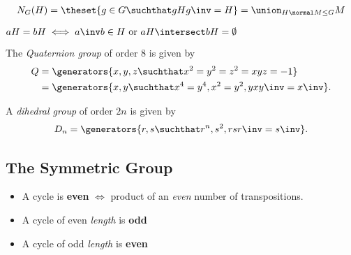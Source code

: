 \begin{definition}[Normalizer]

\begin{align*}
N_G(H) = \theset{g\in G \suchthat gHg\inv = H} = \union_{H\normal M \leq G} M
\end{align*}

\end{definition}

\begin{theorem}

\(aH = bH \iff a\inv b \in H \text{ or } aH \intersect bH = \emptyset\)

\end{theorem}

\begin{definition}

The \emph{Quaternion group} of order 8 is given by \begin{align*}
Q &= \generators{x,y,z \suchthat x^2 = y^2 = z^2 = xyz = -1} \\
  &= \generators{x, y \suchthat  x^4 = y^4, x^2 = y^2, yxy\inv = x\inv}
.\end{align*}

\end{definition}

\begin{definition}

A \emph{dihedral group} of order \(2n\) is given by \begin{align*}
D_n = \generators{r, s \suchthat r^n, s^2, rsr\inv = s\inv }
.\end{align*}

\end{definition}

\hypertarget{the-symmetric-group}{%
\subsection{The Symmetric Group}\label{the-symmetric-group}}

\begin{definition}

\begin{itemize}
\item
  A cycle is \textbf{even} \(\iff\) product of an \emph{even} number of
  transpositions.
\item
  A cycle of even \emph{length} is \textbf{odd}
\item
  A cycle of odd \emph{length} is \textbf{even}
\end{itemize}

\end{definition}

